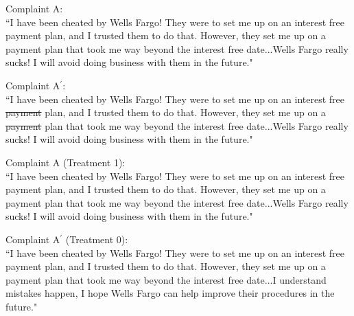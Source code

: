 \documentclass[xcolor=dvipsnames]{beamer}
\begin{document}
\begin{frame}

Complaint A:\\
``I have been cheated by Wells Fargo! They were to set me up on an interest free \alert{payment} plan, and I trusted them to do that. However, they set me up on a \alert{payment} plan that took me way beyond the interest free date...Wells Fargo really sucks! I will avoid doing business with them in the future."

\vspace{0.25in}

Complaint A$^{'}$: \\
``I have been cheated by Wells Fargo! They were to set me up on an interest free \sout{\alert{payment}} plan, and I trusted them to do that. However, they set me up on a \sout{\alert{payment}} plan that took me way beyond the interest free date...Wells Fargo really sucks! I will avoid doing business with them in the future."

\pause
\vspace{0.125in}


\end{frame}

\begin{frame}


Complaint A (Treatment 1):\\
``I have been cheated by Wells Fargo! They were to set me up on an interest free payment plan, and I trusted them to do that. However, they set me up on a payment plan that took me way beyond the interest free date...\alert{Wells Fargo really sucks! I will avoid doing business with them in the future.}"

\vspace{0.25in}

Complaint A$^{'}$ (Treatment 0): \\
``I have been cheated by Wells Fargo! They were to set me up on an interest free payment plan, and I trusted them to do that. However, they set me up on a payment plan that took me way beyond the interest free date...\alert{I understand mistakes happen, I hope Wells Fargo can help improve their procedures in the future}."

\vspace{0.125in}
\pause
{}


\end{frame}
\end{document}
